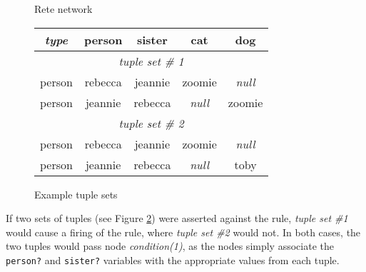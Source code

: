 \begin{figure}[htbpc]
  \begin{center}
   \begin{minipage}{6in}
  \end{minipage}
  \end{center}
  \label{network.rete}
  \caption{Rete network}
\end{figure}

\setlength{\extrarowheight}{3pt}


\begin{figure}[htbpc]
  \begin{center}
    \begin{tabular}{|c||c|c|c|c|}
      \hline
        \emph{\textsf{type}} %
            & \textsf{person} %
            & \textsf{sister} %
            & \textsf{cat} %
            & \textsf{dog} \\
      \hline
      \hline
        \multicolumn{5}{|c|}{\emph{tuple set \# 1}}\\
      \hline 
      \hline 
        person & rebecca & jeannie & zoomie & \emph{null} \\
      \hline
        person & jeannie & rebecca & \emph{null} & zoomie \\
      \hline
      \hline
        \multicolumn{5}{|c|}{\emph{tuple set \# 2}}\\
      \hline
      \hline
        person & rebecca & jeannie & zoomie & \emph{null} \\
      \hline
        person & jeannie & rebecca & \emph{null} & toby \\
      \hline
    \end{tabular}
  \end{center}

  \caption{Example tuple sets}
  \label{table.tuplesets}
\end{figure}

\clearpage

If two sets of tuples (see Figure \ref{table.tuplesets}) were
asserted against the rule, \emph{tuple set \#1} would cause a firing
of the rule, where \emph{tuple set \#2} would not.  In both cases,
the two tuples would pass node \emph{condition(1)}, as the
nodes simply associate the \verb|person?| and \verb|sister?| variables
with the appropriate values from each tuple.

